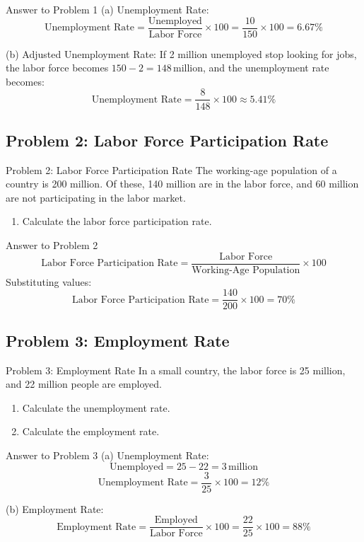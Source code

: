 \documentclass{beamer}
\begin{document}
\begin{frame}{Answer to Problem 1}
(a) Unemployment Rate:
\[
\text{Unemployment Rate} = \frac{\text{Unemployed}}{\text{Labor Force}} \times 100 = \frac{10}{150} \times 100 = 6.67\%
\]

(b) Adjusted Unemployment Rate:  
If 2 million unemployed stop looking for jobs, the labor force becomes \(150 - 2 = 148 \, \text{million}\), and the unemployment rate becomes:
\[
\text{Unemployment Rate} = \frac{8}{148} \times 100 \approx 5.41\%
\]
\end{frame}

\subsection{Problem 2: Labor Force Participation Rate}
\begin{frame}{Problem 2: Labor Force Participation Rate}
The working-age population of a country is 200 million. Of these, 140 million are in the labor force, and 60 million are not participating in the labor market.
\begin{enumerate}
    \item Calculate the labor force participation rate.  
\end{enumerate}
\end{frame}

\begin{frame}{Answer to Problem 2}
\[
\text{Labor Force Participation Rate} = \frac{\text{Labor Force}}{\text{Working-Age Population}} \times 100
\]
Substituting values:
\[
\text{Labor Force Participation Rate} = \frac{140}{200} \times 100 = 70\%
\]
\end{frame}

\subsection{Problem 3: Employment Rate}
\begin{frame}{Problem 3: Employment Rate}
In a small country, the labor force is 25 million, and 22 million people are employed.
\begin{enumerate}
    \item Calculate the unemployment rate.  
    \item Calculate the employment rate.
\end{enumerate}
\end{frame}

\begin{frame}{Answer to Problem 3}
(a) Unemployment Rate:
\[
\text{Unemployed} = 25 - 22 = 3 \, \text{million}
\]
\[
\text{Unemployment Rate} = \frac{3}{25} \times 100 = 12\%
\]

(b) Employment Rate:
\[
\text{Employment Rate} = \frac{\text{Employed}}{\text{Labor Force}} \times 100 = \frac{22}{25} \times 100 = 88\%
\]
\end{frame}
\end{document}
